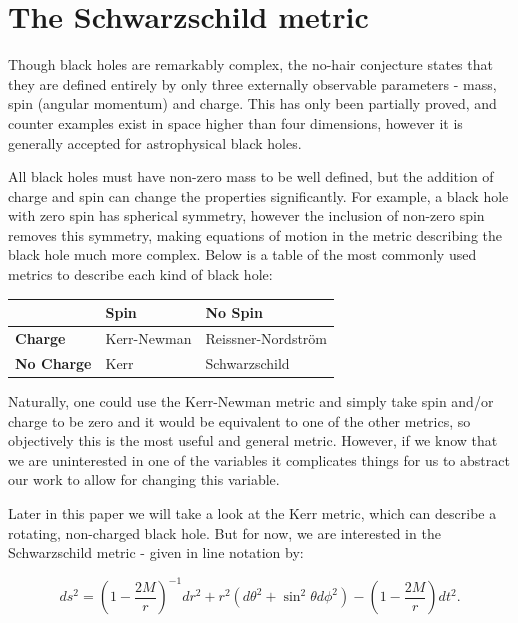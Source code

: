 \documentclass[oneside,openright,frontopenright, singlespacing]{dmathesis}
\begin{document}
\section{The Schwarzschild metric}\label{sec:Section3.1}

	Though black holes are remarkably complex, the no-hair conjecture states that they are defined entirely by only three externally observable parameters - mass, spin (angular momentum) and charge. This has only been partially proved, and counter examples exist in space higher than four dimensions, however it is generally accepted for astrophysical black holes.

	All black holes must have non-zero mass to be well defined, but the addition of charge and spin can change the properties significantly. For example, a black hole with zero spin has spherical symmetry, however the inclusion of non-zero spin removes this symmetry, making equations of motion in the metric describing the black hole much more complex. Below is a table of the most commonly used metrics to describe each kind of black hole:

\begin{center}
	\begin{tabular}{l l l}
		\toprule
		\textbf{ } & \textbf{Spin} & \textbf{No Spin}\\
		\midrule
		\textbf{Charge} & Kerr-Newman & Reissner-Nordström \\
		\midrule
		\textbf{No Charge} & Kerr & Schwarzschild \\
		\bottomrule
	\end{tabular}
\end{center}

	Naturally, one could use the Kerr-Newman metric and simply take spin and/or charge to be zero and it would be equivalent to one of the other metrics, so objectively this is the most useful and general metric. However, if we know that we are uninterested in one of the variables it complicates things for us to abstract our work to allow for changing this variable.

\vspace{1em}
Later in this paper we will take a look at the Kerr metric, which can describe a rotating, non-charged black hole. But for now, we are interested in the Schwarzschild metric - given in line notation by: 

	\[{ds^{2} = {\left(1-\frac {2M}{r}\right)}^{-1}} {dr^2} + {r^2}({d\theta ^2} + {\sin ^2}{\theta}{d\phi ^2}) -{\left(1-\frac {2M}{r}\right)}{dt^2}.\]
\end{document}
